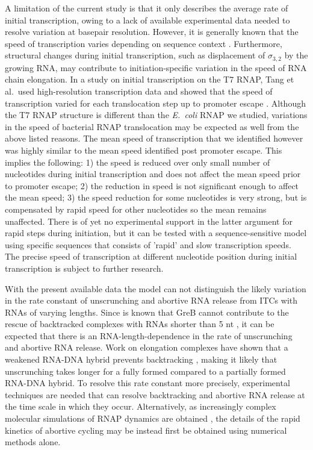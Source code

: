 A limitation of the current study is that it only describes the average rate
of initial transcription, owing to a lack of available experimental data
needed to resolve variation at basepair resolution. However, it is generally
known that the speed of transcription varies depending on sequence context
\cite{bai_mechanochemical_2007,malinen_active_2012}. Furthermore, structural
changes during initial transcription, such as displacement of $\sigma_{3,2}$
by the growing RNA, may contribute to initiation-specific variation in the
speed of RNA chain elongation. In a study on initial transcription on the T7
RNAP, Tang et al.\ used high-resolution transcription data and showed that the
speed of transcription varied for each translocation step up to promoter
escape \cite{tang_real-time_2009}. Although the T7 RNAP structure is different
than the \textit{E.\ coli} RNAP we studied, variations in the speed of
bacterial RNAP translocation may be expected as well from the above listed
reasons. The mean speed of transcription that we identified however was highly
similar to the mean speed identified post promoter escape. This implies the
following: 1) the speed is reduced over only small number of nucleotides during
initial transcription and does not affect the mean speed prior to promoter
escape; 2) the reduction in speed is not significant enough to affect the mean
speed; 3) the speed reduction for some nucleotides is very strong, but is
compensated by rapid speed for other nucleotides so the mean remains
unaffected. There is of yet no experimental support in the latter argument for
rapid steps during initiation, but it can be tested with a sequence-sensitive
model using specific sequences that consists of 'rapid' and slow transcription
speeds. The precise speed of transcription at different nucleotide position
during initial transcription is subject to further research.

With the present available data the model can not distinguish the likely
variation in the rate constant of unscrunching and abortive RNA release from
ITCs with RNAs of varying lengths. Since is known that GreB cannot contribute
to the rescue of backtracked complexes with RNAs shorter than 5 nt
\cite{hsu_initial_2006}, it can be expected that there is an
RNA-length-dependence in the rate of unscrunching and abortive RNA release.
Work on elongation complexes have shown that a weakened RNA-DNA hybrid
prevents backtracking \cite{nudler_rnadna_1997}, making it likely that
unscrunching takes longer for a fully formed compared to a partially formed
RNA-DNA hybrid. To resolve this rate constant more precisely, experimental
techniques are needed that can resolve backtracking and abortive RNA release
at the time scale in which they occur. Alternatively, as increasingly complex
molecular simulations of RNAP dynamics are obtained
\cite{silva_millisecond_2014}, the details of the rapid kinetics of abortive
cycling may be instead first be obtained using numerical methods alone.

